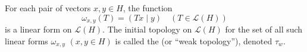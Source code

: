 \begin{definition}
For each pair of vectors $x, y \in H$, the function
$$\omega_{x,y}(T) = (Tx \mid y) \quad (T \in \mathcal{L}(H))$$
is a linear form on $\mathcal{L}(H)$. The initial topology on $\mathcal{L}(H)$ for the set of all such linear forms $\omega_{x,y}$ $(x, y \in H)$ is called the  (or ``weak topology''), denoted $\tau_w$.
\end{definition}
